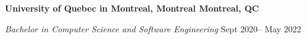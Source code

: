 \textbf{University of Quebec in Montreal, Montreal \hfill Montreal, QC} \par
\textit{Bachelor in Computer Science and Software Engineering} \hfill Sept 2020-- May                          2022\par
